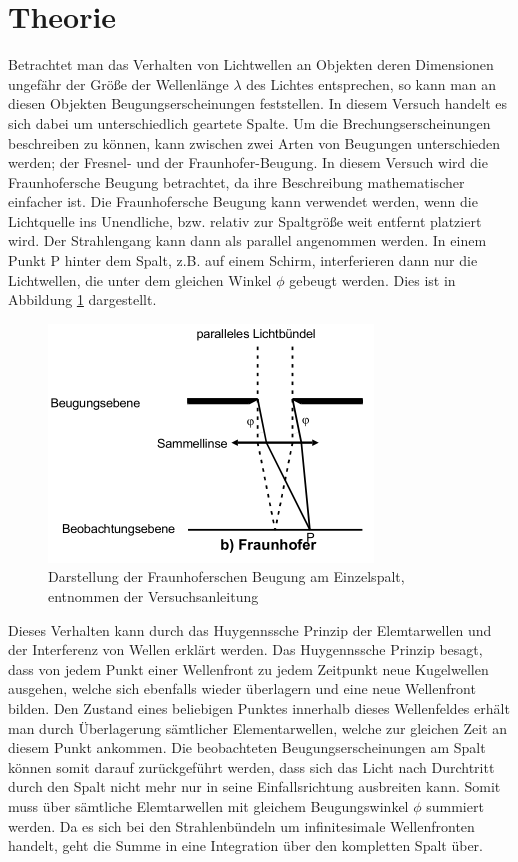\section{Theorie}
\label{sec:Theorie}

Betrachtet man das Verhalten von Lichtwellen an Objekten deren Dimensionen ungefähr der Größe der Wellenlänge $\lambda$ des Lichtes entsprechen, so kann man an diesen Objekten Beugungserscheinungen feststellen.
In diesem Versuch handelt es sich dabei um unterschiedlich geartete Spalte.
Um die Brechungserscheinungen beschreiben zu können, kann zwischen zwei Arten von Beugungen unterschieden werden; der Fresnel- und der Fraunhofer-Beugung.
In diesem Versuch wird die Fraunhofersche Beugung betrachtet, da ihre Beschreibung mathematischer einfacher ist.
Die Fraunhofersche Beugung kann verwendet werden, wenn die Lichtquelle ins Unendliche, bzw. relativ zur Spaltgröße weit entfernt platziert wird.
Der Strahlengang kann dann als parallel angenommen werden.
In einem Punkt P hinter dem Spalt, z.B. auf einem Schirm, interferieren dann nur die Lichtwellen, die unter dem gleichen Winkel $\phi$ gebeugt werden.
Dies ist in Abbildung \ref{fig:Fraunhofer} dargestellt.

\begin{figure}
  \centering
  \includegraphics{images/Fraunhofer.png}
  \caption{Darstellung der Fraunhoferschen Beugung am Einzelspalt, entnommen der Versuchsanleitung \cite[31]{V406}}
  \label{fig:Fraunhofer}
\end{figure}

Dieses Verhalten kann durch das Huygennssche Prinzip der Elemtarwellen und der Interferenz von Wellen erklärt werden.
Das Huygennssche Prinzip besagt, dass von jedem Punkt einer Wellenfront zu jedem Zeitpunkt neue Kugelwellen ausgehen, welche sich ebenfalls wieder überlagern und eine neue Wellenfront bilden.
Den Zustand eines beliebigen Punktes innerhalb dieses Wellenfeldes erhält man durch Überlagerung sämtlicher Elementarwellen, welche zur gleichen Zeit an diesem Punkt ankommen.
Die beobachteten Beugungserscheinungen am Spalt können somit darauf zurückgeführt werden, dass sich das Licht nach Durchtritt durch den Spalt nicht mehr nur in seine Einfallsrichtung ausbreiten kann.
Somit muss über sämtliche Elemtarwellen mit gleichem Beugungswinkel $\phi$ summiert werden.
Da es sich bei den Strahlenbündeln um infinitesimale Wellenfronten handelt, geht die Summe in eine Integration über den kompletten Spalt über.


